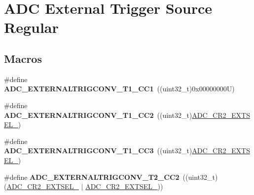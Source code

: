 \hypertarget{group___a_d_c___external__trigger___source___regular}{}\section{A\+DC External Trigger Source Regular}
\label{group___a_d_c___external__trigger___source___regular}
\subsection*{Macros}
\begin{DoxyCompactItemize}
\item 
\mbox{\label{group___a_d_c___external__trigger___source___regular_ga7d49b9a93e2452633d650a5bfd2cce23}} 
\#define {\bfseries A\+D\+C\+\_\+\+E\+X\+T\+E\+R\+N\+A\+L\+T\+R\+I\+G\+C\+O\+N\+V\+\_\+\+T1\+\_\+\+C\+C1}~((uint32\+\_\+t)0x00000000\+U)
\item 
\mbox{\label{group___a_d_c___external__trigger___source___regular_gaf40cf21366c12d956241193bca60b1f9}} 
\#define {\bfseries A\+D\+C\+\_\+\+E\+X\+T\+E\+R\+N\+A\+L\+T\+R\+I\+G\+C\+O\+N\+V\+\_\+\+T1\+\_\+\+C\+C2}~((uint32\+\_\+t)\mbox{\hyperlink{group___peripheral___registers___bits___definition_ga9410c7fd93f6d0b157ede745ee269d7b}{A\+D\+C\+\_\+\+C\+R2\+\_\+\+E\+X\+T\+S\+E\+L\+\_}})
\item 
\mbox{\label{group___a_d_c___external__trigger___source___regular_ga3f562fb50959d72533aecd761175521a}} 
\#define {\bfseries A\+D\+C\+\_\+\+E\+X\+T\+E\+R\+N\+A\+L\+T\+R\+I\+G\+C\+O\+N\+V\+\_\+\+T1\+\_\+\+C\+C3}~((uint32\+\_\+t)\mbox{\hyperlink{group___peripheral___registers___bits___definition_ga5a6725419743a8d01b4a223609952893}{A\+D\+C\+\_\+\+C\+R2\+\_\+\+E\+X\+T\+S\+E\+L\+\_}})
\item 
\mbox{\label{group___a_d_c___external__trigger___source___regular_ga0b64a9b8ac627c2ca770622c8ada41e6}} 
\#define {\bfseries A\+D\+C\+\_\+\+E\+X\+T\+E\+R\+N\+A\+L\+T\+R\+I\+G\+C\+O\+N\+V\+\_\+\+T2\+\_\+\+C\+C2}~((uint32\+\_\+t)(\mbox{\hyperlink{group___peripheral___registers___bits___definition_ga5a6725419743a8d01b4a223609952893}{A\+D\+C\+\_\+\+C\+R2\+\_\+\+E\+X\+T\+S\+E\+L\+\_}} $\vert$ \mbox{\hyperlink{group___peripheral___registers___bits___definition_ga9410c7fd93f6d0b157ede745ee269d7b}{A\+D\+C\+\_\+\+C\+R2\+\_\+\+E\+X\+T\+S\+E\+L\+\_}}))

\end{DoxyCompactItemize}
